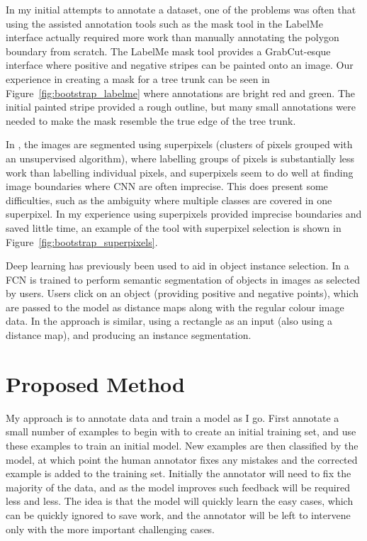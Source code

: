 In my initial attempts to annotate a dataset, one of the problems was often that using the assisted annotation tools such as the mask tool in the LabelMe \cite{Russell2007} interface actually required more work than manually annotating the polygon boundary from scratch. The LabelMe mask tool provides a GrabCut-esque interface where positive and negative stripes can be painted onto an image. Our experience in creating a mask for a tree trunk can be seen in Figure~\ref{fig:bootstrap_labelme} where annotations are bright red and green. The initial painted stripe provided a rough outline, but many small annotations were needed to make the mask resemble the true edge of the tree trunk.

In \cite{Galloway2017}, the images are segmented using superpixels (clusters of pixels grouped with an unsupervised algorithm), where labelling groups of pixels is substantially less work than labelling individual pixels, and superpixels seem to do well at finding image boundaries where \gls{CNN} are often imprecise. This does present some difficulties, such as the ambiguity where multiple classes are covered in one superpixel. In my experience using superpixels provided imprecise boundaries and saved little time, an example of the tool with superpixel selection is shown in Figure~\ref{fig:bootstrap_superpixels}.

Deep learning has previously been used to aid in object instance selection. In \cite{Xu2016} a \gls{FCN} is trained to perform semantic segmentation of objects in images as selected by users. Users click on an object (providing positive and negative points), which are passed to the model as distance maps along with the regular colour image data. In \cite{Xu2017} the approach is similar, using a rectangle as an input (also using a distance map), and producing an instance segmentation.






\section{Proposed Method}

My approach is to annotate data and train a model as I go. First annotate a small number of examples to begin with to create an initial training set, and use these examples to train an initial model. New examples are then classified by the model, at which point the human annotator fixes any mistakes and the corrected example is added to the training set. Initially the annotator will need to fix the majority of the data, and as the model improves such feedback will be required less and less. The idea is that the model will quickly learn the easy cases, which can be quickly ignored to save work, and the annotator will be left to intervene only with the more important challenging cases.

